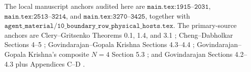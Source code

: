 \begin{remark}
The local manuscript anchors audited here are
\(\texttt{main.tex:1915--2031}\),
\(\texttt{main.tex:2513--3214}\), and
\(\texttt{main.tex:3270--3425}\), together with
\(\texttt{agent\_material/10\_boundary\_row\_physical\_hosts.tex}\).
The primary-source anchors are Clery--Gritsenko Theorems 0.1, 1.4, and 3.1
\cite{GC}; Cheng--Dabholkar Sections 4--5 \cite{CD09BKM};
Govindarajan--Gopala Krishna Sections 4.3--4.4 \cite{GK09CHL};
Govindarajan--Gopala Krishna's composite \(N=4\) Section 5.3
\cite{GK10Composite}; and Govindarajan Sections 4.2--4.3 plus Appendices
C--D \cite{Gov11BKM}.
\end{remark}
